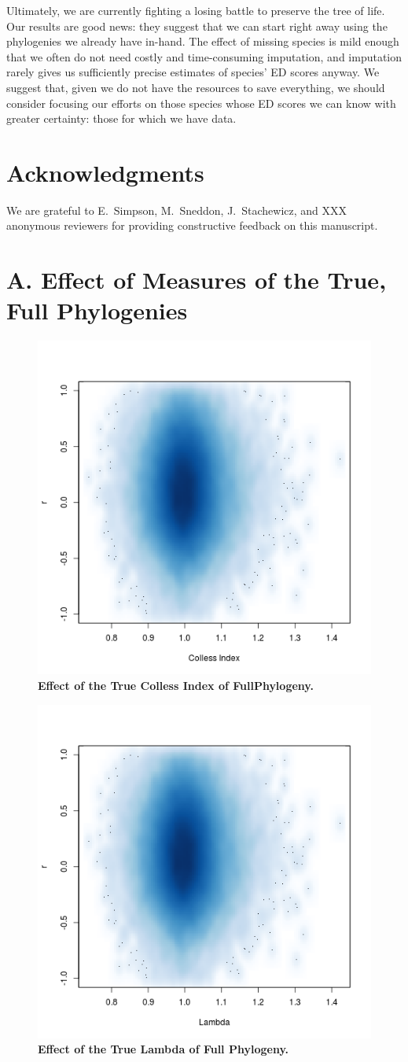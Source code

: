 \documentclass[12pt,english]{article}
\begin{document}
Ultimately, we are currently fighting a losing battle to preserve the tree of
life. Our results are good news: they suggest that we can start right away using
the phylogenies we already have in-hand. The effect of missing species is mild
enough that we often do not need costly and time-consuming imputation, and
imputation rarely gives us sufficiently precise estimates of species' ED scores
anyway. We suggest that, given we do not have the resources to save everything,
we should consider focusing our efforts on those species whose ED scores we can
know with greater certainty: those for which we have data.

\section*{Acknowledgments}
We are grateful to E.\ Simpson, M.\ Sneddon, J.\ Stachewicz, and XXX
anonymous reviewers for providing constructive feedback on this
manuscript.

\clearpage
\printbibliography

\clearpage
\appendix
\section*{A. Effect of Measures of the True, Full Phylogenies}

\begin{figure}[!ht]
  \center
  \includegraphics[width=.5\textwidth]{trueColless.png}
  \caption{\textbf{Effect of the True Colless Index of FullPhylogeny.}}
\end{figure}

\begin{figure}[!ht]
  \center
  \includegraphics[width=.5\textwidth]{trueLambda.png}
  \caption{\textbf{Effect of the True Lambda of Full Phylogeny.}}
\end{figure}
\end{document}
